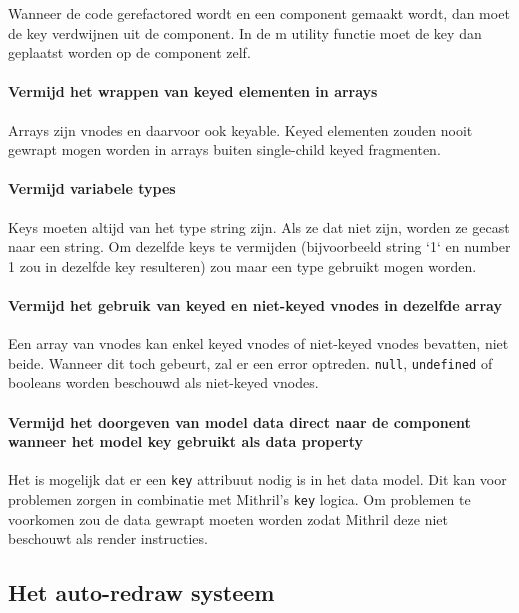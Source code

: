 Wanneer de code gerefactored wordt en een component gemaakt wordt, dan moet de key verdwijnen uit de component. In de m utility functie moet de key dan geplaatst worden op de component zelf. \autocite{Mithril2019d}

\paragraph{Vermijd het wrappen van keyed elementen in arrays}

Arrays zijn vnodes en daarvoor ook keyable. Keyed elementen zouden nooit gewrapt mogen worden in arrays buiten single-child keyed fragmenten. \autocite{Mithril2019d}

\paragraph{Vermijd variabele types}

Keys moeten altijd van het type string zijn. Als ze dat niet zijn, worden ze gecast naar een string. Om dezelfde keys te vermijden (bijvoorbeeld string `1` en number 1 zou in dezelfde key resulteren) zou maar een type gebruikt mogen worden. \autocite{Mithril2019d}

\paragraph{Vermijd het gebruik van keyed en niet-keyed vnodes in dezelfde array}

Een array van vnodes kan enkel keyed vnodes of niet-keyed vnodes bevatten, niet beide. Wanneer dit toch gebeurt, zal er een error optreden. \texttt{null}, \texttt{undefined} of booleans worden beschouwd als niet-keyed vnodes. \autocite{Mithril2019d}

\paragraph{Vermijd het doorgeven van model data direct naar de component wanneer het model key gebruikt als data property}

Het is mogelijk dat er een \texttt{key} attribuut nodig is in het data model. Dit kan voor problemen zorgen in combinatie met Mithril's \texttt{key} logica. Om problemen te voorkomen zou de data gewrapt moeten worden zodat Mithril deze niet beschouwt als render instructies. \autocite{Mithril2019d}


\subsection{Het auto-redraw systeem}

